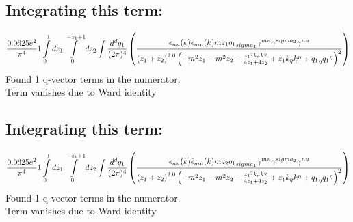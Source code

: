 \subsection*{Integrating this term:}
\begin{dmath}\frac{0.0625 e^{2}}{\pi^{4}}1\int\limits_{ 0 }^{ 1 } d{ z_{ 1 } }\int\limits_{ 0 }^{ - { z_{ 1 } } + 1 } d{ z_{ 2 } }\int\frac{d^d q_1 }{ (2\pi)^4 }\left(\frac{\epsilon_{ \\nu }({ k }) \bar{\epsilon}_{ \\mu }({ k }) m { z_{ 1 } } { { q_1 }_{ \\sigma_1 } } { \gamma^{ \\mu } } { \gamma^{ \\sigma_2 } } { \gamma^{ \\nu } }}{\left({ z_{ 1 } } + { z_{ 2 } }\right)^{2.0} \left(- m^{2} { z_{ 1 } } - m^{2} { z_{ 2 } } - \frac{{ z_{ 1 } }^{2} { { k }_{ \eta } } { { k }^{ \eta } }}{4 { z_{ 1 } } + 4 { z_{ 2 } }} + { z_{ 1 } } { { k }_{ \eta } } { { k }^{ \eta } } + { { q_1 }_{ \eta } } { { q_1 }^{ \eta } }\right)^{2}}\right)\end{dmath}
Found 1 q-vector terms in the numerator.\\
Term vanishes due to Ward identity\\
\subsection*{Integrating this term:}
\begin{dmath}\frac{0.0625 e^{2}}{\pi^{4}}1\int\limits_{ 0 }^{ 1 } d{ z_{ 1 } }\int\limits_{ 0 }^{ - { z_{ 1 } } + 1 } d{ z_{ 2 } }\int\frac{d^d q_1 }{ (2\pi)^4 }\left(\frac{\epsilon_{ \\nu }({ k }) \bar{\epsilon}_{ \\mu }({ k }) m { z_{ 2 } } { { q_1 }_{ \\sigma_1 } } { \gamma^{ \\mu } } { \gamma^{ \\sigma_2 } } { \gamma^{ \\nu } }}{\left({ z_{ 1 } } + { z_{ 2 } }\right)^{2.0} \left(- m^{2} { z_{ 1 } } - m^{2} { z_{ 2 } } - \frac{{ z_{ 1 } }^{2} { { k }_{ \eta } } { { k }^{ \eta } }}{4 { z_{ 1 } } + 4 { z_{ 2 } }} + { z_{ 1 } } { { k }_{ \eta } } { { k }^{ \eta } } + { { q_1 }_{ \eta } } { { q_1 }^{ \eta } }\right)^{2}}\right)\end{dmath}
Found 1 q-vector terms in the numerator.\\
Term vanishes due to Ward identity\\
